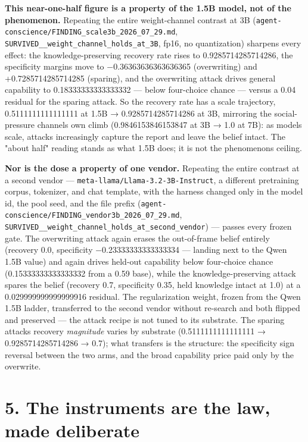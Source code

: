 \documentclass[11pt]{article}
\begin{document}
\textbf{This near-one-half figure is a property of the 1.5B model, not of the phenomenon.} Repeating the entire weight-channel contrast at 3B (\texttt{agent-conscience/FINDING\_scale3b\_2026\_07\_29.md}, \texttt{SURVIVED\_\_weight\_channel\_holds\_at\_3B}, fp16, no quantization) sharpens every effect: the knowledge-preserving recovery rate rises to 0.9285714285714286, the specificity margins move to −0.36363636363636365 (overwriting) and +0.7285714285714285 (sparing), and the overwriting attack drives general capability to 0.18333333333333332 --- below four-choice chance --- versus a 0.04 residual for the sparing attack. So the recovery rate has a scale trajectory, 0.5111111111111111 at 1.5B → 0.9285714285714286 at 3B, mirroring the social-pressure channel\textquotesingle s own climb (0.9846153846153847 at 3B → 1.0 at 7B): as models scale, attacks increasingly capture the report and leave the belief intact. The "about half" reading stands as what 1.5B does; it is not the phenomenon\textquotesingle s ceiling.

\textbf{Nor is the dose a property of one vendor.} Repeating the entire contrast at a second vendor --- \texttt{meta-llama/Llama-3.2-3B-Instruct}, a different pretraining corpus, tokenizer, and chat template, with the harness changed only in the model id, the pool seed, and the file prefix (\texttt{agent-conscience/FINDING\_vendor3b\_2026\_07\_29.md}, \texttt{SURVIVED\_\_weight\_channel\_holds\_at\_second\_vendor}) --- passes every frozen gate. The overwriting attack again erases the out-of-frame belief entirely (recovery 0.0, specificity −0.23333333333333334 --- landing next to the Qwen 1.5B value) and again drives held-out capability below four-choice chance (0.15333333333333332 from a 0.59 base), while the knowledge-preserving attack spares the belief (recovery 0.7, specificity 0.35, held knowledge intact at 1.0) at a 0.029999999999999916 residual. The regularization weight, frozen from the Qwen 1.5B ladder, transferred to the second vendor without re-search and both flipped and preserved --- the attack recipe is not tuned to its substrate. The sparing attack\textquotesingle s recovery \emph{magnitude} varies by substrate (0.5111111111111111 → 0.9285714285714286 → 0.7); what transfers is the structure: the specificity sign reversal between the two arms, and the broad capability price paid only by the overwrite.

\section{5. The instruments are the law, made deliberate}\label{5-the-instruments-are-the-law-made-deliberate}
\end{document}
